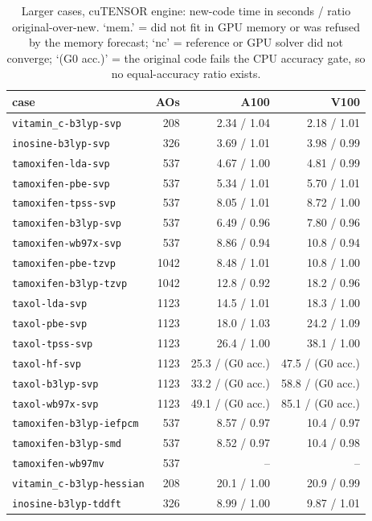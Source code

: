 \begin{table}[!htbp]
\centering
\small
\begin{tabular}{lrrr}
\toprule
case & AOs & A100 & V100 \\
\midrule
\texttt{vitamin\_c-b3lyp-svp} & 208 & 2.34 / 1.04 & 2.18 / 1.01 \\
\texttt{inosine-b3lyp-svp} & 326 & 3.69 / 1.01 & 3.98 / 0.99 \\
\texttt{tamoxifen-lda-svp} & 537 & 4.67 / 1.00 & 4.81 / 0.99 \\
\texttt{tamoxifen-pbe-svp} & 537 & 5.34 / 1.01 & 5.70 / 1.01 \\
\texttt{tamoxifen-tpss-svp} & 537 & 8.05 / 1.01 & 8.72 / 1.00 \\
\texttt{tamoxifen-b3lyp-svp} & 537 & 6.49 / 0.96 & 7.80 / 0.96 \\
\texttt{tamoxifen-wb97x-svp} & 537 & 8.86 / 0.94 & 10.8 / 0.94 \\
\texttt{tamoxifen-pbe-tzvp} & 1042 & 8.48 / 1.01 & 10.8 / 1.00 \\
\texttt{tamoxifen-b3lyp-tzvp} & 1042 & 12.8 / 0.92 & 18.2 / 0.96 \\
\texttt{taxol-lda-svp} & 1123 & 14.5 / 1.01 & 18.3 / 1.00 \\
\texttt{taxol-pbe-svp} & 1123 & 18.0 / 1.03 & 24.2 / 1.09 \\
\texttt{taxol-tpss-svp} & 1123 & 26.4 / 1.00 & 38.1 / 1.00 \\
\texttt{taxol-hf-svp} & 1123 & 25.3 / (G0 acc.) & 47.5 / (G0 acc.) \\
\texttt{taxol-b3lyp-svp} & 1123 & 33.2 / (G0 acc.) & 58.8 / (G0 acc.) \\
\texttt{taxol-wb97x-svp} & 1123 & 49.1 / (G0 acc.) & 85.1 / (G0 acc.) \\
\texttt{tamoxifen-b3lyp-iefpcm} & 537 & 8.57 / 0.97 & 10.4 / 0.97 \\
\texttt{tamoxifen-b3lyp-smd} & 537 & 8.52 / 0.97 & 10.4 / 0.98 \\
\texttt{tamoxifen-wb97mv} & 537 & -- & -- \\
\texttt{vitamin\_c-b3lyp-hessian} & 208 & 20.1 / 1.00 & 20.9 / 0.99 \\
\texttt{inosine-b3lyp-tddft} & 326 & 8.99 / 1.00 & 9.87 / 1.01 \\
\bottomrule
\end{tabular}
\caption{Larger cases, cuTENSOR engine: new-code time in seconds / ratio original-over-new. `mem.' = did not fit in GPU memory or was refused by the memory forecast; `nc' = reference or GPU solver did not converge; `(G0 acc.)' = the original code fails the CPU accuracy gate, so no equal-accuracy ratio exists.}
\label{tab:large_cutensor}
\end{table}
